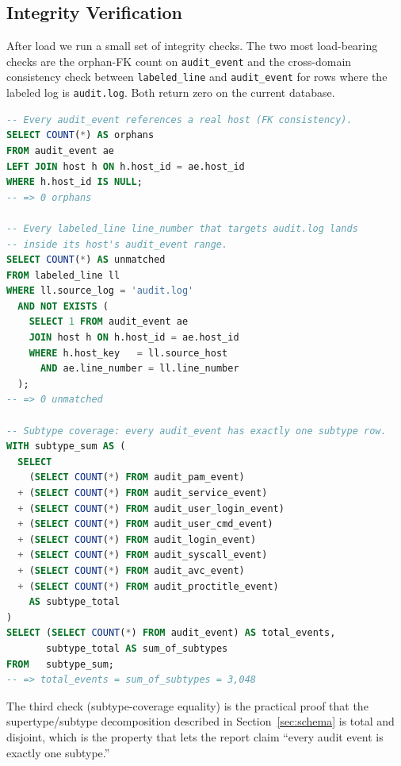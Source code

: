 \subsection{Integrity Verification}
After load we run a small set of integrity checks. The two most
load-bearing checks are the orphan-FK count on \texttt{audit\_event}
and the cross-domain consistency check between \texttt{labeled\_line}
and \texttt{audit\_event} for rows where the labeled log is
\texttt{audit.log}. Both return zero on the current database.

\begin{lstlisting}[language=SQL,basicstyle=\ttfamily\scriptsize]
-- Every audit_event references a real host (FK consistency).
SELECT COUNT(*) AS orphans
FROM audit_event ae
LEFT JOIN host h ON h.host_id = ae.host_id
WHERE h.host_id IS NULL;
-- => 0 orphans

-- Every labeled_line line_number that targets audit.log lands
-- inside its host's audit_event range.
SELECT COUNT(*) AS unmatched
FROM labeled_line ll
WHERE ll.source_log = 'audit.log'
  AND NOT EXISTS (
    SELECT 1 FROM audit_event ae
    JOIN host h ON h.host_id = ae.host_id
    WHERE h.host_key   = ll.source_host
      AND ae.line_number = ll.line_number
  );
-- => 0 unmatched

-- Subtype coverage: every audit_event has exactly one subtype row.
WITH subtype_sum AS (
  SELECT
    (SELECT COUNT(*) FROM audit_pam_event)
  + (SELECT COUNT(*) FROM audit_service_event)
  + (SELECT COUNT(*) FROM audit_user_login_event)
  + (SELECT COUNT(*) FROM audit_user_cmd_event)
  + (SELECT COUNT(*) FROM audit_login_event)
  + (SELECT COUNT(*) FROM audit_syscall_event)
  + (SELECT COUNT(*) FROM audit_avc_event)
  + (SELECT COUNT(*) FROM audit_proctitle_event)
    AS subtype_total
)
SELECT (SELECT COUNT(*) FROM audit_event) AS total_events,
       subtype_total AS sum_of_subtypes
FROM   subtype_sum;
-- => total_events = sum_of_subtypes = 3,048
\end{lstlisting}

The third check (subtype-coverage equality) is the practical proof
that the supertype/subtype decomposition described in
Section~\ref{sec:schema} is total and disjoint, which is the property
that lets the report claim ``every audit event is exactly one
subtype.''
